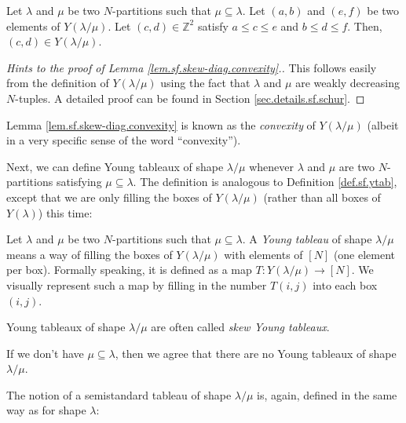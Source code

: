 \begin{lemma}
\label{lem.sf.skew-diag.convexity}Let
$\lambda$ and $\mu$ be two $N$-partitions such that $\mu\subseteq\lambda$. Let
$\left(  a,b\right)  $ and $\left(  e,f\right)  $ be two elements of $Y\left(
\lambda/\mu\right)  $. Let $\left(  c,d\right)  \in\mathbb{Z}^{2}$ satisfy
$a\leq c\leq e$ and $b\leq d\leq f$. Then, $\left(  c,d\right)  \in Y\left(
\lambda/\mu\right)  $.
\end{lemma}

\begin{proof}
[Hints to the proof of Lemma \ref{lem.sf.skew-diag.convexity}.]This follows
easily from the definition of $Y\left(  \lambda/\mu\right)  $ using the fact
that $\lambda$ and $\mu$ are weakly decreasing $N$-tuples. A detailed proof
can be found in Section \ref{sec.details.sf.schur}.
\end{proof}

Lemma \ref{lem.sf.skew-diag.convexity} is known as the \emph{convexity} of
$Y\left(  \lambda/\mu\right)  $ (albeit in a very specific sense of the word
\textquotedblleft convexity\textquotedblright).

Next, we can define Young tableaux of shape $\lambda/\mu$ whenever $\lambda$
and $\mu$ are two $N$-partitions satisfying $\mu\subseteq\lambda$. The
definition is analogous to Definition \ref{def.sf.ytab}, except that we are
only filling the boxes of $Y\left(  \lambda/\mu\right)  $ (rather than all
boxes of $Y\left(  \lambda\right)  $) this time:

\begin{definition}
\label{def.sf.skew-tab}Let $\lambda$ and $\mu$ be two $N$-partitions such that
$\mu\subseteq\lambda$. A \emph{Young tableau} of shape $\lambda/\mu$ means a
way of filling the boxes of $Y\left(  \lambda/\mu\right)  $ with elements of
$\left[  N\right]  $ (one element per box). Formally speaking, it is defined
as a map $T:Y\left(  \lambda/\mu\right)  \rightarrow\left[  N\right]  $. We
visually represent such a map by filling in the number $T\left(  i,j\right)  $
into each box $\left(  i,j\right)  $.

Young tableaux of shape $\lambda/\mu$ are often called \emph{skew Young
tableaux}.

If we don't have $\mu\subseteq\lambda$, then we agree that there are no Young
tableaux of shape $\lambda/\mu$.
\end{definition}

The notion of a semistandard tableau of shape $\lambda/\mu$ is, again, defined
in the same way as for shape $\lambda$:

